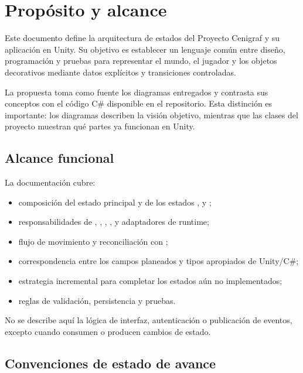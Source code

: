 \section{Propósito y alcance}

Este documento define la arquitectura de estados del Proyecto Cenigraf y su aplicación en Unity. Su objetivo es establecer un lenguaje común entre diseño, programación y pruebas para representar el mundo, el jugador y los objetos decorativos mediante datos explícitos y transiciones controladas.

La propuesta toma como fuente los diagramas entregados y contrasta sus conceptos con el código C\# disponible en el repositorio. Esta distinción es importante: los diagramas describen la visión objetivo, mientras que las clases del proyecto muestran qué partes ya funcionan en Unity.

\subsection{Alcance funcional}

La documentación cubre:

\begin{itemize}
  \item composición del estado principal y de los estados ,  y ;
  \item responsabilidades de , , , ,  y adaptadores de runtime;
  \item flujo de movimiento y reconciliación con ;
  \item correspondencia entre los campos planeados y tipos apropiados de Unity/C\#;
  \item estrategia incremental para completar los estados aún no implementados;
  \item reglas de validación, persistencia y pruebas.
\end{itemize}

No se describe aquí la lógica de interfaz, autenticación o publicación de eventos, excepto cuando consumen o producen cambios de estado.

\subsection{Convenciones de estado de avance}

